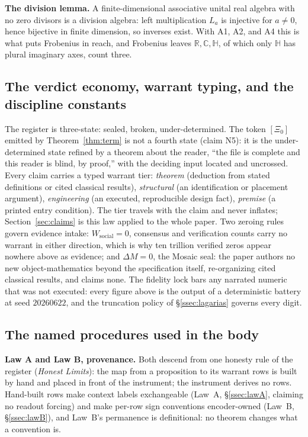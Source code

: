 \documentclass[twocolumn,10pt]{article}
\theoremstyle{plain}
\theoremstyle{definition}
\newcommand{\tXi}{[\Xi_0]}
\newcommand{\Rl}{\mathbb{R}}
\newcommand{\Hq}{\mathbb{H}}
\begin{document}
\textbf{The division lemma.} A finite-dimensional associative unital real algebra with no zero divisors is a division algebra: left multiplication $L_a$ is injective for $a\ne0$, hence bijective in finite dimension, so inverses exist. With A1, A2, and A4 this is what puts Frobenius \cite{Frobenius1878} in reach, and Frobenius leaves $\Rl,\mathbb C,\Hq$, of which only $\Hq$ has plural imaginary axes, count three.

\subsection{The verdict economy, warrant typing, and the discipline constants}
The register is three-state: sealed, broken, under-determined. The token $\tXi$ emitted by Theorem~\ref{thm:term} is not a fourth state (claim N5): it is the under-determined state refined by a theorem about the reader, ``the file is complete and this reader is blind, by proof,'' with the deciding input located and uncrossed. Every claim carries a typed warrant tier: \emph{theorem} (deduction from stated definitions or cited classical results), \emph{structural} (an identification or placement argument), \emph{engineering} (an executed, reproducible design fact), \emph{premise} (a printed entry condition). The tier travels with the claim and never inflates; Section~\ref{sec:claims} is this law applied to the whole paper. Two zeroing rules govern evidence intake: $W_{\mathrm{social}}=0$, consensus and verification counts carry no warrant in either direction, which is why ten trillion verified zeros appear nowhere above as evidence; and $\Delta M=0$, the Mosaic seal: the paper authors no new object-mathematics beyond the specification itself, re-organizing cited classical results, and claims none. The fidelity lock bars any narrated numeric that was not executed: every figure above is the output of a deterministic battery at seed $20260622$, and the truncation policy of \S\ref{ssec:lagarias} governs every digit.

\subsection{The named procedures used in the body}
\textbf{Law A and Law B, provenance.} Both descend from one honesty rule of the register (\emph{Honest Limits}): the map from a proposition to its warrant rows is built by hand and placed in front of the instrument; the instrument derives no rows. Hand-built rows make context labels exchangeable (Law~A, \S\ref{ssec:lawA}, claiming no readout forcing) and make per-row sign conventions encoder-owned (Law~B, \S\ref{ssec:lawB}), and Law~B's permanence is definitional: no theorem changes what a convention is.
\end{document}
